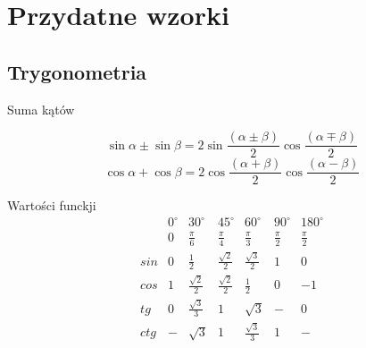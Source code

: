 \documentclass{article}
\newenvironment{kol2}{\noindent \begin{minipage}[t]{0.5\linewidth}}{\end{minipage}}
\begin{document}
\newpage

\section{Przydatne wzorki}
\subsection{Trygonometria}

\begin{kol2}

    \noindent
    Suma kątów

    $$  \sin{\alpha}\pm\sin{\beta}=
        2\sin{\frac{\left(\alpha\pm\beta\right)}{2}}
        \cos{\frac{\left(\alpha\mp\beta\right)}{2}} $$
    $$  \cos{\alpha}+\cos{\beta}=
        2\cos{\frac{\left(\alpha+\beta\right)}{2}}
        \cos{\frac{\left(\alpha-\beta\right)}{2}} $$
\end{kol2}
\begin{kol2}

    \noindent
    Wartości funckji
    $$
        \begin{array}{c|c|c|c|c|c|c}
                & 0^\circ & 30^\circ       & 45^\circ       & 60^\circ       & 90^\circ  & 180^\circ \\
                & 0       & \frac\pi6      & \frac\pi4      & \frac{\pi}3    & \frac\pi2 & \frac\pi2 \\ \hline
            sin & 0       & \frac12        & \frac{\sqrt2}2 & \frac{\sqrt3}2 & 1         & 0         \\
            cos & 1       & \frac{\sqrt2}2 & \frac{\sqrt2}2 & \frac12        & 0         & -1        \\ \hline
            tg  & 0       & \frac{\sqrt3}3 & 1              & \sqrt3         & -         & 0         \\
            ctg & -       & \sqrt3         & 1              & \frac{\sqrt3}3 & 1         & -         \\
        \end{array}
    $$
\end{kol2}
\end{document}

